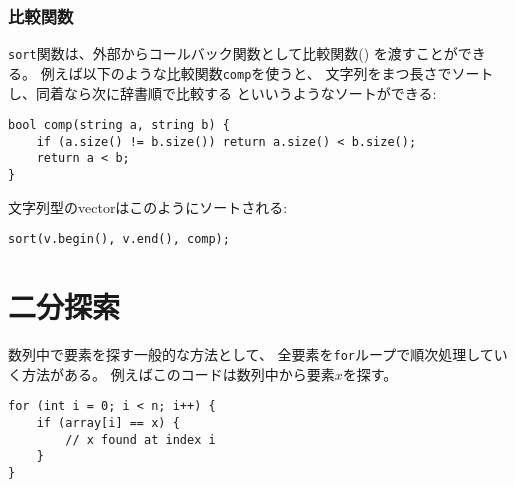 \subsubsection{比較関数}


\texttt{sort}関数は、外部からコールバック関数として比較関数()
を渡すことができる。
例えば以下のような比較関数\texttt{comp}を使うと、
文字列をまつ長さでソートし、同着なら次に辞書順で比較する
といいうようなソートができる:

\begin{lstlisting}
bool comp(string a, string b) {
    if (a.size() != b.size()) return a.size() < b.size();
    return a < b;
}
\end{lstlisting}
\begin{comment}
Now a vector of strings can be sorted as follows:
\end{comment}
文字列型のvectorはこのようにソートされる:
\begin{lstlisting}
sort(v.begin(), v.end(), comp);
\end{lstlisting}

\begin{comment}
\section{Binary search}

\index{binary search}

A general method for searching for an element
in an array is to use a \texttt{for} loop
that iterates through the elements of the array.
For example, the following code searches for
an element $x$ in an array:
\end{comment}

\section{二分探索}


数列中で要素を探す一般的な方法として、
全要素を\texttt{for}ループで順次処理していく方法がある。
例えばこのコードは数列中から要素$x$を探す。

\begin{lstlisting}
for (int i = 0; i < n; i++) {
    if (array[i] == x) {
        // x found at index i
    }
}
\end{lstlisting}


